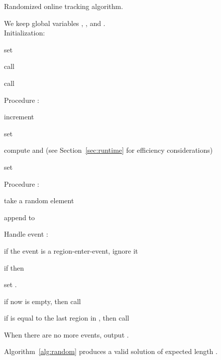 \documentclass[runningheads]{llncs}
\begin{document}
      
      \begin {algorithm} [ht]
        \caption {Randomized online tracking algorithm.} \label {alg:random}
        We keep global variables , , and .\\
        Initialization:
        \begin {compactenum}
          \item set 
          \item call 
          \item call 
        \end {compactenum}
        Procedure :
        \begin {compactenum}
          \item increment 
          \item set 
          \item compute  and  (see Section~\ref {sec:runtime} for efficiency considerations)
          \item set 
        \end {compactenum}
        Procedure :
        \begin {compactenum}
          \item take a random element 
          \item append  to 
        \end {compactenum}
        Handle event :
        \begin {compactenum}
          \item if the event is a region-enter-event, ignore it
          \item if  then
          \begin {compactenum}
            \item set .
            \item if  now is empty, then call 
            \item if  is equal to the last region in , then call 
          \end {compactenum}         
        \end {compactenum}
        When there are no more events, output .
      \end{algorithm}


      \begin {lemma} \label {lem:randomlog}
        Algorithm~\ref {alg:random} produces a valid solution of expected length .
      \end {lemma}
      
\end{document}
